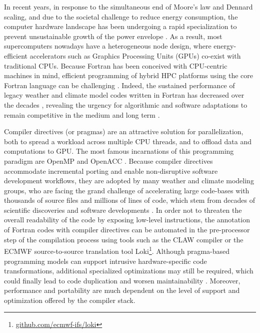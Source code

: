 \documentclass[gmd,manuscript,online]{copernicus}
\begin{document}
	In recent years, in response to the simultaneous end of Moore's law and Dennard scaling, and due to the societal challenge to reduce energy consumption, the computer hardware landscape has been undergoing a rapid specialization to prevent unsustainable growth of the power envelope \citep{muller19}. As a result, most supercomputers nowadays have a heterogeneous node design, where energy-efficient accelerators such as Graphics Processing Units (GPUs) co-exist with traditional CPUs. Because Fortran has been conceived with CPU-centric machines in mind, efficient programming of hybrid HPC platforms using the core Fortran language can be challenging \citep{mendez14, lawrence18}. Indeed, the sustained performance of legacy weather and climate model codes written in Fortran has decreased over the decades \citep{schulthess18}, revealing the urgency for algorithmic and software adaptations to remain competitive in the medium and long term \citep{bauer21}.

	Compiler directives (or pragmas) are an attractive solution for parallelization, both to spread a workload across multiple CPU threads, and to offload data and computations to GPU. The most famous incarnations of this programming paradigm are OpenMP \citep{dagum98} and OpenACC \citep{chandrasekaran17}. Because compiler directives accommodate incremental porting and enable non-disruptive software development workflows, they are adopted by many weather and climate modeling groups, who are facing the grand challenge of accelerating large code-bases with thousands of source files and millions of lines of code, which stem from decades of scientific discoveries and software developments \citep{lapillonne17, lapillonne20, randall22}. In order not to threaten the overall readability of the code by exposing low-level instructions, the annotation of Fortran codes with compiler directives can be automated in the pre-processor step of the compilation process using tools such as the CLAW compiler \citep{clement19} or the ECMWF source-to-source translation tool Loki\footnote{\url{github.com/ecmwf-ifs/loki}}. Although pragma-based programming models can support intrusive hardware-specific code transformations, additional specialized optimizations may still be required, which could finally lead to code duplication and worsen maintainability \citep{dahm23}. Moreover, performance and portability are much dependent on the level of support and optimization offered by the compiler stack.
\end{document}
